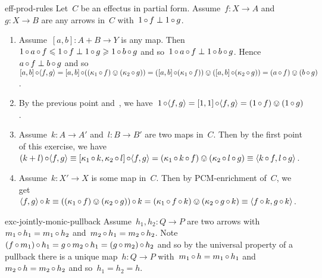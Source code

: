 \begin{solution}{eff-prod-rules}%
   Let~$C$ be an effectus in partial form.
Assume~$f\colon X \to A$ and~$g\colon X \to B$
    are any arrows in~$C$ with~$1 \mathop{\circ} f \perp 1 \mathop{\circ} g$.
\begin{enumerate}
\item Assume~$[a,b]\colon A+B \to Y$ is any map.
Then~$1 \mathop{\circ} a \mathop{\circ} f \leqslant 1 \mathop{\circ} f \perp 1 \mathop{\circ} g
        \geqslant 1 \mathop{\circ} b \mathop{\circ} g$
        and so~$1 \mathop{\circ} a \mathop{\circ} f \perp 1 \mathop{\circ} b \mathop{\circ} g$.
    Hence~$a \mathop{\circ} f \perp b \mathop{\circ} g$
    and so~$[a,b] \mathop{\circ} \langle f, g \rangle
        = [a,b] \mathop{\circ} ((\kappa_1 \mathop{\circ} f) \ovee (\kappa_2 \mathop{\circ} g))
        = ([a,b] \mathop{\circ} (\kappa_1 \mathop{\circ} f)) \ovee ([a,b] \mathop{\circ} (\kappa_2 \mathop{\circ} g)) = (a \mathop{\circ} f) \ovee (b \mathop{\circ} g)$.
\item By the previous point and~,
        we have~$1 \mathop{\circ} \langle f,g\rangle
            = [1,1] \mathop{\circ} \langle f,g\rangle
            = (1 \mathop{\circ} f) \ovee (1 \mathop{\circ} g)$.
\item Assume~$k\colon A \to A'$ and~$l \colon B \to B'$ are two maps in~$C$.
    Then by the first point of this exercise,
            we have~$(k+l) \mathop{\circ} \langle f, g\rangle
                \equiv [\kappa_1 \mathop{\circ} k, \kappa_2 \mathop{\circ} l] \mathop{\circ}
                    \langle f, g \rangle 
                = (\kappa_1 \mathop{\circ} k \mathop{\circ} f) \ovee
                (\kappa_2 \mathop{\circ} l \mathop{\circ} g) \equiv \langle 
                k \mathop{\circ} f, l \mathop{\circ} g \rangle $.
\item
Assume~$k\colon X' \to X$ is some map in~$C$.
Then by PCM-enrichment of~$C$, we
    get~$\langle f, g \rangle \mathop{\circ} k 
        \equiv ((\kappa_1 \mathop{\circ} f) \ovee (\kappa_2 \mathop{\circ} g)) \mathop{\circ} k
        = (\kappa_1 \mathop{\circ} f\mathop{\circ} k) \ovee (\kappa_2 \mathop{\circ} g \mathop{\circ} k)
        \equiv \langle f \mathop{\circ} k, g\mathop{\circ} k\rangle$.
\end{enumerate}
\end{solution}
\spacingfix{}
\begin{solution}{exc-jointly-monic-pullback}%
    Assume~$h_1,h_2 \colon Q \to P$
        are two arrows with~$m_1 \mathop{\circ} h_1 = m_1 \mathop{\circ} h_2$
        and~$m_2 \mathop{\circ} h_1 = m_2 \mathop{\circ} h_2$.
    Note~$(f \mathop{\circ} m_1) \mathop{\circ} h_1= g \mathop{\circ} m_2 \mathop{\circ} h_1
        = (g \mathop{\circ} m_2) \mathop{\circ} h_2$
        and so by the universal property of a pullback
        there is a unique map~$h\colon Q \to P$
        with~$m_1 \mathop{\circ} h = m_1 \mathop{\circ} h_1$
            and~$m_2 \mathop{\circ} h = m_2 \mathop{\circ} h_2$
            and so~$h_1 = h_2 = h$.
\end{solution}
